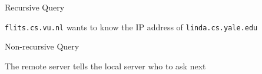 \begin{frame}{Recursive Query}
  \begin{iblock}{\texttt{flits.cs.vu.nl} wants to know the IP address of
      \texttt{linda.cs.yale.edu}}
    \begin{center}
    \end{center}
  \end{iblock}
\end{frame}

\begin{frame}{Non-recursive Query}
  \begin{iblock}{The remote server tells the local server who to ask next}
    \begin{center}
    \end{center}
    \label{fig:non_recursive}
  \end{iblock}
\end{frame}

